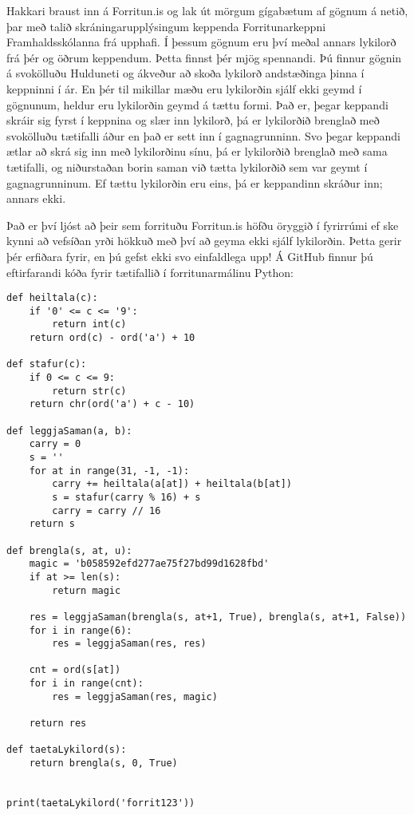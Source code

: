 

Hakkari braust inn á Forritun.is og lak út mörgum gígabætum af gögnum á netið,
þar með talið skráningarupplýsingum keppenda Forritunarkeppni Framhaldsskólanna
frá upphafi. Í þessum gögnum eru því meðal annars lykilorð frá þér og öðrum
keppendum. Þetta finnst þér mjög spennandi. Þú finnur gögnin á svokölluðu
Hulduneti og ákveður að skoða lykilorð andstæðinga þinna í keppninni í ár. En
þér til mikillar mæðu eru lykilorðin sjálf ekki geymd í gögnunum, heldur eru
lykilorðin geymd á tættu formi. Það er, þegar keppandi skráir sig fyrst í
keppnina og slær inn lykilorð, þá er lykilorðið brenglað með svokölluðu
tætifalli áður en það er sett inn í gagnagrunninn. Svo þegar keppandi ætlar að
skrá sig inn með lykilorðinu sínu, þá er lykilorðið brenglað með sama
tætifalli, og niðurstaðan borin saman við tætta lykilorðið sem var geymt í
gagnagrunninum. Ef tættu lykilorðin eru eins, þá er keppandinn skráður inn;
annars ekki.

Það er því ljóst að þeir sem forrituðu Forritun.is höfðu öryggið í fyrirrúmi ef
ske kynni að vefsíðan yrði hökkuð með því að geyma ekki sjálf lykilorðin. Þetta
gerir þér erfiðara fyrir, en þú gefst ekki svo einfaldlega upp! Á GitHub finnur
þú eftirfarandi kóða fyrir tætifallið í forritunarmálinu Python:

\begin{verbatim}
def heiltala(c):
    if '0' <= c <= '9':
        return int(c)
    return ord(c) - ord('a') + 10

def stafur(c):
    if 0 <= c <= 9:
        return str(c)
    return chr(ord('a') + c - 10)

def leggjaSaman(a, b):
    carry = 0
    s = ''
    for at in range(31, -1, -1):
        carry += heiltala(a[at]) + heiltala(b[at])
        s = stafur(carry % 16) + s
        carry = carry // 16
    return s

def brengla(s, at, u):
    magic = 'b058592efd277ae75f27bd99d1628fbd'
    if at >= len(s):
        return magic

    res = leggjaSaman(brengla(s, at+1, True), brengla(s, at+1, False))
    for i in range(6):
        res = leggjaSaman(res, res)

    cnt = ord(s[at])
    for i in range(cnt):
        res = leggjaSaman(res, magic)

    return res

def taetaLykilord(s):
    return brengla(s, 0, True)


print(taetaLykilord('forrit123'))
\end{verbatim}

